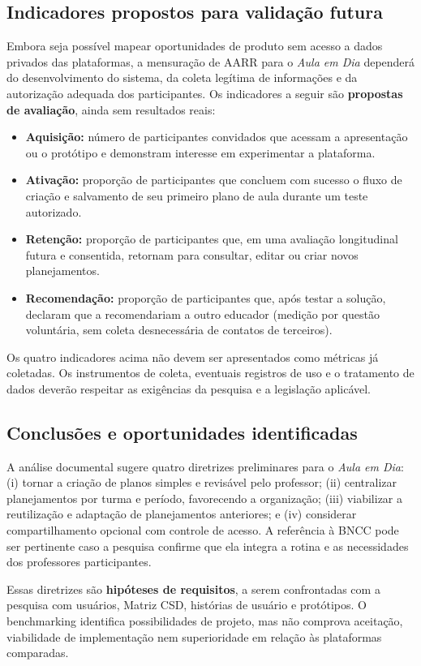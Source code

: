 \subsection{Indicadores propostos para validação futura}
Embora seja possível mapear oportunidades de produto sem acesso a dados privados das plataformas, a mensuração de AARR para o \textit{Aula em Dia} dependerá do desenvolvimento do sistema, da coleta legítima de informações e da autorização adequada dos participantes. Os indicadores a seguir são \textbf{propostas de avaliação}, ainda sem resultados reais:
\begin{itemize}
  \item \textbf{Aquisição:} número de participantes convidados que acessam a apresentação ou o protótipo e demonstram interesse em experimentar a plataforma.
  \item \textbf{Ativação:} proporção de participantes que concluem com sucesso o fluxo de criação e salvamento de seu primeiro plano de aula durante um teste autorizado.
  \item \textbf{Retenção:} proporção de participantes que, em uma avaliação longitudinal futura e consentida, retornam para consultar, editar ou criar novos planejamentos.
  \item \textbf{Recomendação:} proporção de participantes que, após testar a solução, declaram que a recomendariam a outro educador (medição por questão voluntária, sem coleta desnecessária de contatos de terceiros).
\end{itemize}
Os quatro indicadores acima não devem ser apresentados como métricas já coletadas. Os instrumentos de coleta, eventuais registros de uso e o tratamento de dados deverão respeitar as exigências da pesquisa e a legislação aplicável.

\subsection{Conclusões e oportunidades identificadas}
A análise documental sugere quatro diretrizes preliminares para o \textit{Aula em Dia}: (i) tornar a criação de planos simples e revisável pelo professor; (ii) centralizar planejamentos por turma e período, favorecendo a organização; (iii) viabilizar a reutilização e adaptação de planejamentos anteriores; e (iv) considerar compartilhamento opcional com controle de acesso. A referência à BNCC pode ser pertinente caso a pesquisa confirme que ela integra a rotina e as necessidades dos professores participantes.

Essas diretrizes são \textbf{hipóteses de requisitos}, a serem confrontadas com a pesquisa com usuários, Matriz CSD, histórias de usuário e protótipos. O benchmarking identifica possibilidades de projeto, mas não comprova aceitação, viabilidade de implementação nem superioridade em relação às plataformas comparadas.
